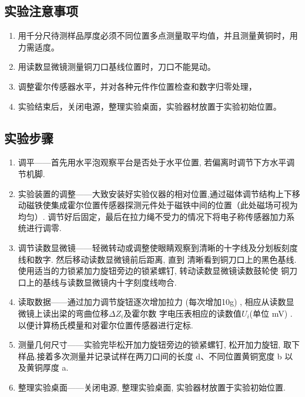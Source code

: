 \documentclass[UTF8]{article}
\theoremstyle{MyLineTheoremStyle} %
\theoremstyle{MyBlockTheoremStyle} %
\theoremstyle{MySubsubsectionStyle} %
\begin{document}
\subsection{实验注意事项}
\begin{enumerate}
\item 用千分尺待测样品厚度必须不同位置多点测量取平均值，并且测量黄铜时，用力需适度。

\item 用读数显微镜测量铜刀口基线位置时，刀口不能晃动。

\item 调整霍尔传感器水平，并对各种元件作位置检查和数字归零处理，

\item 实验结束后，关闭电源，整理实验桌面，实验器材放置于实验初始位置。
\end{enumerate}



\subsection{实验步骤}

\begin{enumerate}
\item 调平——首先用水平泡观察平台是否处于水平位置, 若偏离时调节下方水平调节机脚. 

\item 实验装置的调整——大致安装好实验仪器的相对位置,通过磁体调节结构上下移动磁铁使集成霍尔位置传感器探测元件处于磁铁中间的位置（此处磁场可视为均匀）.
调节好后固定，最后在拉力绳不受力的情况下将电子称传感器加力系统进行调零.


\item 调节读数显微镜——轻微转动或调整使眼睛观察到清晰的十字线及分划板刻度线和数字. 然后移动读数显微镜前后距离, 直到
清晰看到铜刀口上的黑色基线. 使用适当的力锁紧加力旋钮旁边的锁紧螺钉, 转动读数显微镜读数鼓轮使
铜刀口上的基线与读数显微镜内十字刻度线吻合.

\item 读取数据——通过加力调节旋钮逐次增加拉力 (每次增加10g) , 相应从读数显微镜上读出梁的弯曲位移$\Delta Z_i$及霍尔数
字电压表相应的读数值$U_i$(单位 mV) . 以便计算杨氏模量和对霍尔位置传感器进行定标.

\item 测量几何尺寸——实验完毕松开加力旋钮旁边的锁紧螺钉, 松开加力旋钮, 取下样品.接着多次测量并记录试样在两刀口间的长度 d、不同位置黄铜宽度 b 以及黄铜厚度 a.

\item 整理实验桌面——关闭电源, 整理实验桌面, 实验器材放置于实验初始位置.
\end{enumerate}
\end{document}
